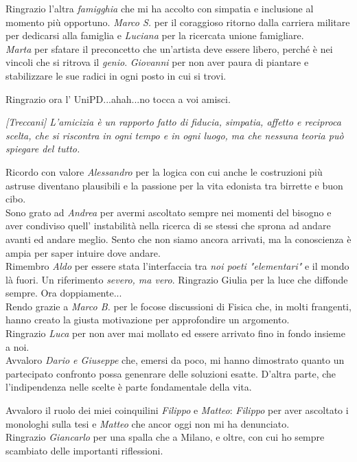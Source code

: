 \documentclass[a4paper,10pt, oneside]{book} %
\theoremstyle{definition}
\begin{document}
Ringrazio l'altra \textit{famigghia} che mi ha accolto con simpatia e inclusione al momento più opportuno.
\textit{Marco S.} per il coraggioso ritorno dalla carriera militare per dedicarsi alla famiglia e \textit{Luciana} per la ricercata unione famigliare. \\ \textit{Marta} per sfatare il preconcetto che un'artista deve essere libero, perché è nei vincoli che si ritrova il \textit{genio}. \textit{Giovanni} per non aver paura di piantare e stabilizzare le sue radici in ogni posto in cui si trovi.

Ringrazio ora l' UniPD...ahah...no tocca a voi amisci.

\textit{[Treccani] L'amicizia è un rapporto fatto di fiducia, simpatia, affetto e reciproca scelta, che si riscontra in ogni tempo e in ogni luogo, ma che nessuna teoria può spiegare del tutto.}

Ricordo con valore \textit{Alessandro} per la logica con cui anche le costruzioni più astruse diventano plausibili e la passione per la vita edonista tra birrette e buon cibo. \\
Sono grato ad \textit{Andrea} per avermi ascoltato sempre nei momenti del bisogno e aver condiviso quell' instabilità nella ricerca di se stessi che sprona ad andare avanti ed andare meglio. Sento che non siamo ancora arrivati, ma la conoscienza è ampia per saper intuire dove andare.\\
Rimembro \textit{Aldo} per essere stata l'interfaccia tra \textit{noi poeti "elementari"} e il mondo là fuori. Un riferimento \textit{severo, ma vero}. Ringrazio Giulia per la luce che diffonde sempre. Ora doppiamente...\\
Rendo grazie a \textit{Marco B.} per le focose discussioni di Fisica che, in molti frangenti, hanno creato la giusta motivazione per approfondire un argomento. \\
Ringrazio \textit{Luca}  per non aver mai mollato ed essere arrivato fino in fondo insieme a noi.\\
Avvaloro \textit{Dario e Giuseppe} che, emersi da poco, mi hanno dimostrato quanto un partecipato confronto possa genenrare delle soluzioni esatte. D'altra parte, che l'indipendenza nelle scelte è parte fondamentale della vita.

Avvaloro il ruolo dei miei coinquilini \textit{Filippo} e \textit{Matteo}: \textit{Filippo} per aver ascoltato i monologhi sulla tesi e \textit{Matteo} che ancor oggi non mi ha denunciato.\\
Ringrazio \textit{Giancarlo} per una spalla che a Milano, e oltre, con cui ho sempre scambiato delle importanti riflessioni.
\end{document}
